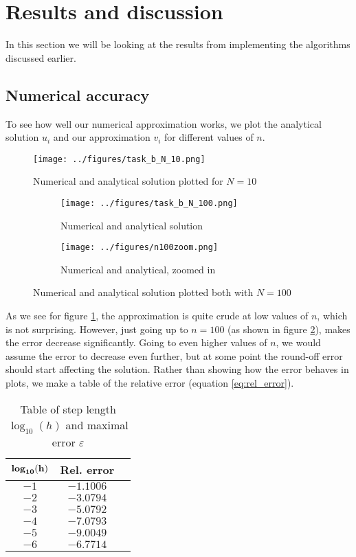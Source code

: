 \documentclass{article}
\begin{document}
\section{Results and discussion}
In this section we will be looking at the results from implementing the algorithms discussed earlier.
\subsection{Numerical accuracy}
To see how well our numerical approximation works, we plot the analytical solution $u_i$ and our approximation $v_i$ for different values of $n$.
\begin{figure}[H]
  \centering
  \texttt{[image: ../figures/task\_b\_N\_10.png]}
  \caption{Numerical and analytical solution plotted for $N = 10$}
  \label{fig:n10}
\end{figure}
\begin{figure}[H]
  \centering
  \begin{subfigure}[b]{0.49\textwidth}
    \texttt{[image: ../figures/task\_b\_N\_100.png]}
    \caption{Numerical and analytical solution}
    \label{fig:n100}
  \end{subfigure}
  \begin{subfigure}[b]{0.49\textwidth}
    \texttt{[image: ../figures/n100zoom.png]}
    \caption{Numerical and analytical, zoomed in}
    \label{fig:n100_zoom}
  \end{subfigure}
  \caption{Numerical and analytical solution plotted both with $N = 100$}
  \label{fig:n100_2}
\end{figure}
As we see for figure \ref{fig:n10}, the approximation is quite crude at low values of $n$, which is not surprising. However, just going up to $n=100$ (as shown in figure \ref{fig:n100}), makes the error decrease significantly. Going to even higher values of $n$, we would assume the error to decrease even further, but at some point the round-off error should start affecting the solution. Rather than showing how the error behaves in plots, we make a table of the relative error (equation \eqref{eq:rel_error}).
\begin{table}[H]
  \centering
  \caption{Table of step length $\log_{10}(h)$ and maximal error $\varepsilon$}
  \begin{tabular}{|c|c|c|}
    \hline
    $\mathbf{\text{\textbf{log}}_{10}(h)}$&\textbf{Rel. error}\\\hline
    $-1$&$-1.1006$\\\hline
    $-2$&$-3.0794$\\\hline
    $-3$&$-5.0792$\\\hline
    $-4$&$-7.0793$\\\hline
    $-5$&$-9.0049$\\\hline
    $-6$&$-6.7714$\\\hline
  \end{tabular}
  \label{tab:error}
\end{table}
\end{document}
